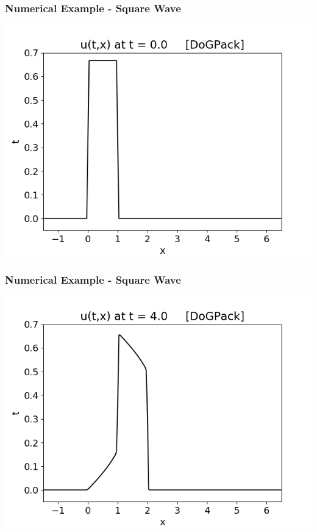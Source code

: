 \documentclass[10pt]{beamer}
\begin{document}
    \begin{frame}
      \frametitle{Numerical Example - Square Wave}
      \begin{center}
        \includegraphics[scale=0.6]{Figures/squarewave00.png}
      \end{center}
    \end{frame}
    \begin{frame}
      \frametitle{Numerical Example - Square Wave}
      \begin{center}
        \includegraphics[scale=0.6]{Figures/squarewave04.png}
      \end{center}
    \end{frame}
\end{document}
